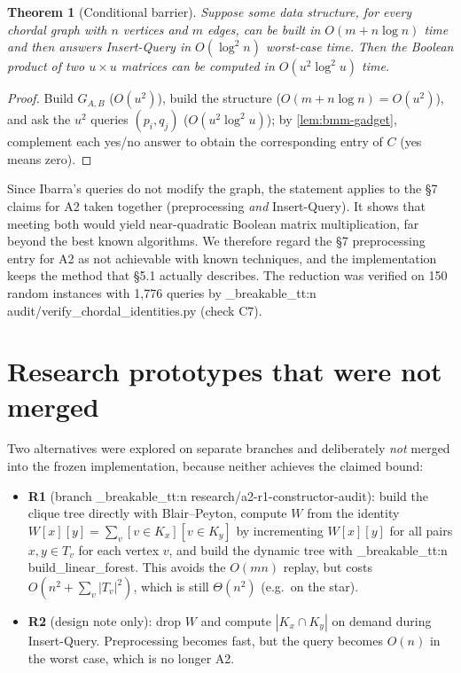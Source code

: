 \documentclass[11pt,a4paper,oneside]{report}
\theoremstyle{plain}
\newtheorem{theorem}{Theorem}[chapter]
\theoremstyle{definition}
\theoremstyle{remark}
\newcommand{\op}[1]{\textsf{#1}}
\DeclareRobustCommand{\code}[1]{\mtp_breakable_tt:n {#1}}
\DeclareRobustCommand{\file}[1]{\mtp_breakable_tt:n {#1}}
\begin{document}
\begin{theorem}[Conditional barrier]\label{thm:bmm}
Suppose some data structure, for every chordal graph with \(n\) vertices and \(m\) edges, can be
built in \(O(m+n\log n)\) time and then answers \op{Insert-Query} in \(O(\log^2 n)\) worst-case
time. Then the Boolean product of two \(u\times u\) matrices can be computed in
\(O(u^2\log^2 u)\) time.
\end{theorem}
\begin{proof}
Build \(G_{A,B}\) (\(O(u^2)\)), build the structure (\(O(m+n\log n)=O(u^2)\)), and ask the
\(u^2\) queries \((p_i,q_j)\) (\(O(u^2\log^2 u)\)); by \cref{lem:bmm-gadget}, complement
each yes/no answer to obtain the corresponding entry of \(C\) (yes means zero).
\end{proof}

Since Ibarra's queries do not modify the graph, the statement applies to the \S7 claims for A2
taken together (preprocessing \emph{and} \op{Insert-Query}). It shows that meeting both would
yield near-quadratic Boolean matrix multiplication, far beyond the best known algorithms. We
therefore regard the \S7 preprocessing entry for A2 as not achievable with known techniques,
and the implementation keeps the method that \S5.1 actually describes. The reduction was
verified on 150 random instances with 1{,}776 queries by \file{audit/verify_chordal_identities.py}
(check C7).

\section{Research prototypes that were not merged}
Two alternatives were explored on separate branches and deliberately \emph{not} merged into the
frozen implementation, because neither achieves the claimed bound:
\begin{itemize}
\item \textbf{R1} (branch \code{research/a2-r1-constructor-audit}): build the clique tree
  directly with Blair--Peyton, compute \(W\) from the identity
  \(W[x][y]=\sum_v[v\in K_x][v\in K_y]\) by incrementing \(W[x][y]\) for all pairs
  \(x,y\in T_v\) for each vertex \(v\), and build the dynamic tree with
  \code{build_linear_forest}. This avoids the \(O(mn)\) replay, but costs
  \(O(n^2+\sum_v|T_v|^2)\), which is still \(\Theta(n^2)\) (e.g.\ on the star).
\item \textbf{R2} (design note only): drop \(W\) and compute \(|K_x\cap K_y|\) on demand during
  \op{Insert-Query}. Preprocessing becomes fast, but the query becomes \(O(n)\) in the worst
  case, which is no longer A2.
\end{itemize}
\end{document}
